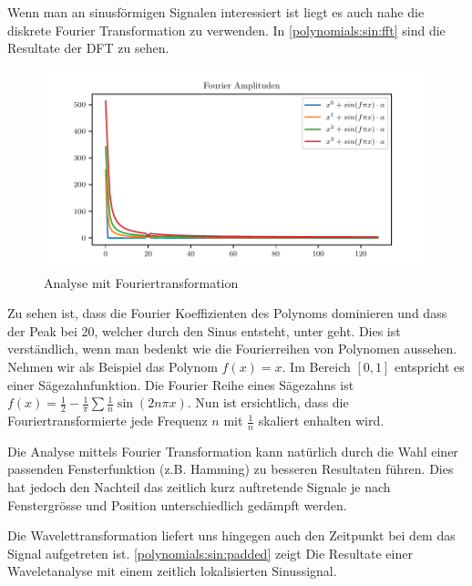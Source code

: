 \begin{refsection}
Wenn man an sinusförmigen Signalen interessiert ist liegt es auch nahe die
diskrete Fourier Transformation zu verwenden. In \autoref{polynomials:sin:fft}
sind die Resultate der DFT zu sehen.

\begin{figure}
    \centering
    \includegraphics{papers/polynomials/images/polynomials_sin_fft.pdf}
    \caption{Analyse mit Fouriertransformation\label{polynomials:sin:fft}}
\end{figure}

Zu sehen ist, dass die Fourier Koeffizienten des Polynoms dominieren und dass
der Peak bei 20, welcher durch den Sinus entsteht, unter geht. Dies ist
verständlich, wenn man bedenkt wie die Fourierreihen von Polynomen aussehen.
Nehmen wir als Beispiel das Polynom $f(x) = x$. Im Bereich $[0, 1]$ entspricht
es einer Sägezahnfunktion. Die Fourier Reihe eines Sägezahns ist $f(x) =
\frac{1}{2} - \frac{1}{\pi} \sum{\frac{1}{n} \sin(2 n \pi x)}$. Nun ist
ersichtlich, dass die Fouriertransformierte jede Frequenz $n$ mit $\frac{1}{n}$
skaliert enhalten wird.

Die Analyse mittels Fourier Transformation kann natürlich durch die Wahl einer
passenden Fensterfunktion (z.B. Hamming) zu besseren Resultaten führen. Dies
hat jedoch den Nachteil das zeitlich kurz auftretende Signale je nach
Fenstergrösse und Position unterschiedlich gedämpft werden.

Die Wavelettransformation liefert uns hingegen auch den Zeitpunkt bei dem das
Signal aufgetreten ist.  \autoref{polynomials:sin:padded} zeigt Die Resultate
einer Waveletanalyse mit einem zeitlich lokalisierten Sinussignal.


\end{refsection}

